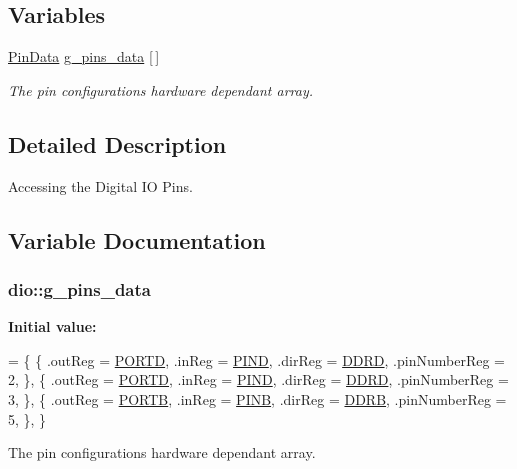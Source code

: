\subsection*{Variables}
\begin{DoxyCompactItemize}
\item 
\hyperlink{structdio_1_1PinData}{Pin\+Data} \hyperlink{namespacedio_a151716277cf44ae15991502d1b6c6b63}{g\+\_\+pins\+\_\+data} \mbox{[}$\,$\mbox{]}
\begin{DoxyCompactList}\small\item\em The pin configurations hardware dependant array. \end{DoxyCompactList}\end{DoxyCompactItemize}


\subsection{Detailed Description}
Accessing the Digital I\+O Pins. 

\subsection{Variable Documentation}
\hypertarget{namespacedio_a151716277cf44ae15991502d1b6c6b63}{
\subsubsection[{g\+\_\+pins\+\_\+data}]{ dio\+::g\+\_\+pins\+\_\+data}}\label{namespacedio_a151716277cf44ae15991502d1b6c6b63}
{\bfseries Initial value\+:}
\begin{DoxyCode}
=
    \{
        \{
            .outReg = \hyperlink{group__DIOMCAL_ga3e6a2517db4f9cb7c9037adf0aefe79b}{PORTD},
            .inReg = \hyperlink{group__DIOMCAL_ga50997bc44119b844ceaab463c564bfb7}{PIND},
            .dirReg = \hyperlink{group__DIOMCAL_gae24189eeb3ce4bccd97d46e88f494e0a}{DDRD},
            .pinNumberReg = 2,
        \},
        \{
            .outReg = \hyperlink{group__DIOMCAL_ga3e6a2517db4f9cb7c9037adf0aefe79b}{PORTD},
            .inReg = \hyperlink{group__DIOMCAL_ga50997bc44119b844ceaab463c564bfb7}{PIND},
            .dirReg = \hyperlink{group__DIOMCAL_gae24189eeb3ce4bccd97d46e88f494e0a}{DDRD},
            .pinNumberReg = 3,
        \},
        \{
            .outReg = \hyperlink{group__DIOMCAL_ga09a0c85cd3da09d9cdf63a5ac4c39f77}{PORTB},
            .inReg = \hyperlink{group__DIOMCAL_ga49f0e8289e962c02128f24b94d7aea7c}{PINB},
            .dirReg = \hyperlink{group__DIOMCAL_ga924a54df722121bc98383bdec5ae1898}{DDRB},
            .pinNumberReg = 5,
        \},
    \}
\end{DoxyCode}


The pin configurations hardware dependant array. 

